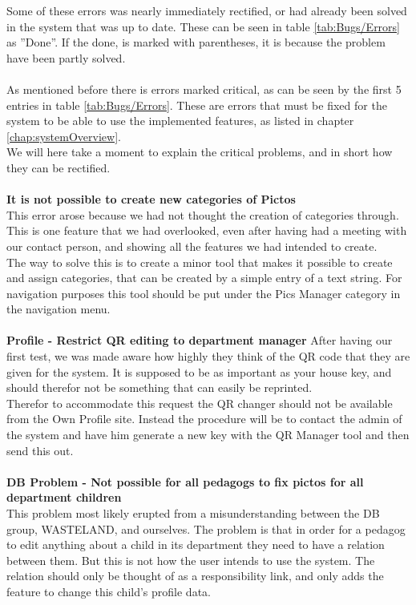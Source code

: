 Some of these errors was nearly immediately rectified, or had already been solved in the system that was up to date. These can be seen in table \ref{tab:Bugs/Errors} as ''Done''. If the done, is marked with parentheses, it is because the problem have been partly solved.\\
\\
As mentioned before there is errors marked critical, as can be seen by the first 5 entries in table \ref{tab:Bugs/Errors}. These are errors that must be fixed for the system to be able to use the implemented features, as listed in chapter \vref{chap:systemOverview}.\\
We will here take a moment to explain the critical problems, and in short how they can be rectified.\\
\\
\textbf{It is not possible to create new categories of Pictos}\\
This error arose because we had not thought the creation of categories through. This is one feature that we had overlooked, even after having had a meeting with our contact person, and showing all the features we had intended to create.\\
The way to solve this is to create a minor tool that makes it possible to create and assign categories, that can be created by a simple entry of a text string. For navigation purposes this tool should be put under the Pics Manager category in the navigation menu.\\
\\
\textbf{Profile - Restrict QR editing to department manager}
After having our first test, we was made aware how highly they think of the QR code that they are given for the system. It is supposed to be as important as your house key, and should therefor not be something that can easily be reprinted.\\
Therefor to accommodate this request the QR changer should not be available from the Own Profile site. Instead the procedure will be to contact the admin of the system and have him generate a new key with the QR Manager tool and then send this out.\\
\\
\textbf{DB Problem - Not possible for all pedagogs to fix pictos for all department children}\\
This problem most likely erupted from a misunderstanding between the DB group, WASTELAND, and ourselves. The problem is that in order for a pedagog to edit anything about a child in its department they need to have a relation between them. But this is not how the user intends to use the system. The relation should only be thought of as a responsibility link, and only adds the feature to change this child’s profile data.\\
